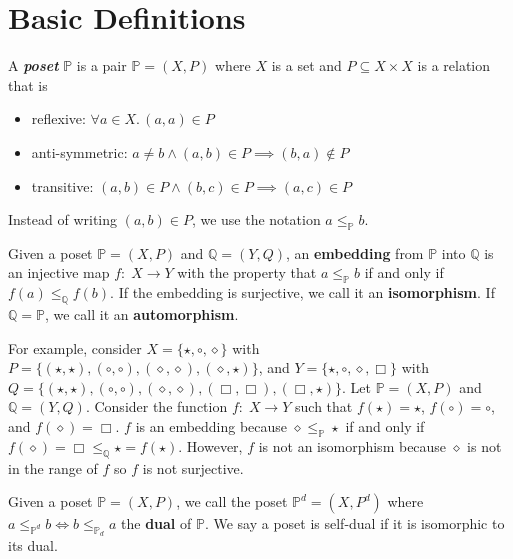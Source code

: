 \section{Basic Definitions}

\begin{definition}
    A \textit{\textbf{poset}} $\mathbb{P}$ is a pair $\mathbb{P} = (X,P)$ where $X$ is a set and $P \subseteq X \times X$ is a relation that is
    \begin{itemize}
        \item reflexive: $\forall a \in X.\, (a,a) \in P$
        \item anti-symmetric: $a \neq b \land (a,b) \in P \implies (b,a) \not\in P$
        \item transitive: $(a,b) \in P \land (b,c) \in P \implies (a,c) \in P$
    \end{itemize}
\end{definition}

Instead of writing $(a,b) \in P$, we use the notation $a \leq_{\mathbb{P}} b$.

\begin{definition}
    Given a poset $\mathbb{P} = (X,P)$ and $\mathbb{Q} = (Y,Q)$, an \textbf{embedding} from $\mathbb{P}$ into $\mathbb{Q}$ is an injective map $f:\; X \to Y$ with the property that $a \leq_{\mathbb{P}} b$ if and only if $f(a) \leq_{\mathbb{Q}} f(b)$. If the embedding is surjective, we call it an \textbf{isomorphism}. If $\mathbb{Q} = \mathbb{P}$, we call it an \textbf{automorphism}.
\end{definition}

For example, consider $X = \{\star, \circ, \diamond \}$ with $P = \{ (\star,\star), (\circ,\circ), (\diamond, \diamond), (\diamond, \star) \}$, and $Y = \{\star, \circ, \diamond, \Box \}$ with $Q = \{ (\star,\star), (\circ,\circ), (\diamond,\diamond), (\Box,\Box), (\Box,\star) \}$. Let $\mathbb{P} = (X,P)$ and $\mathbb{Q} = (Y,Q)$. Consider the function $f:\; X \to Y$ such that $f(\star) = \star$, $f(\circ) = \circ$, and $f(\diamond) = \Box$. $f$ is an embedding because $\diamond \leq_{\mathbb{P}} \star$ if and only if $f(\diamond) = \Box \leq_{\mathbb{Q}} \star = f(\star)$. However, $f$ is not an isomorphism because $\diamond$ is not in the range of $f$ so $f$ is not surjective.

\begin{definition}[Dual]
    Given a poset $\mathbb{P} = (X,P)$, we call the poset $\mathbb{P}^d = (X,P^d)$ where $a \leq_{\mathbb{P}^d} b \iff b \leq_{\mathbb{P}_d} a$ the \textbf{dual} of $\mathbb{P}$. We say a poset is self-dual if it is isomorphic to its dual.
\end{definition}

